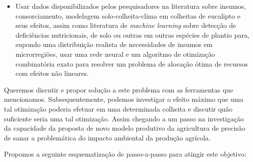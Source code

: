 \documentclass[14pt,a4paper]{article}
\begin{document}
		\begin{itemize}
			\item Usar dados disponibilizados pelos pesquisadores na literatura sobre insumos, consorciamento, modelagem solo-colheita-clima em colheitas de eucalipto e seus efeitos, assim como literatura de \textit{machine learning} sobre detecção de deficiências nutricionais, de solo ou outras em outras espécies de plantio para, supondo uma distribuição realista de necessidades de insumos em microrregiões, usar uma rede neural e um algoritmo de otimização combinatória exato para resolver um problema de alocação ótima de recursos com efeitos não lineares.
		\end{itemize} 
		
		Queremos discutir e propor solução a este problema com as ferramentas que mencionamos. Subsequentemente, podemos investigar o efeito máximo que uma tal otimização poderia efetuar em uma determinada colheita e discutir quão suficiente seria uma tal otimização. Assim chegando a um passo na investigação da capacidade da proposta de novo modelo produtivo da agricultura de precisão de sanar a problemática do impacto ambiental da produção agrícola.

	Propomos a seguinte esquematização de passo-a-passo para atingir este objetivo:
	
\end{document}
